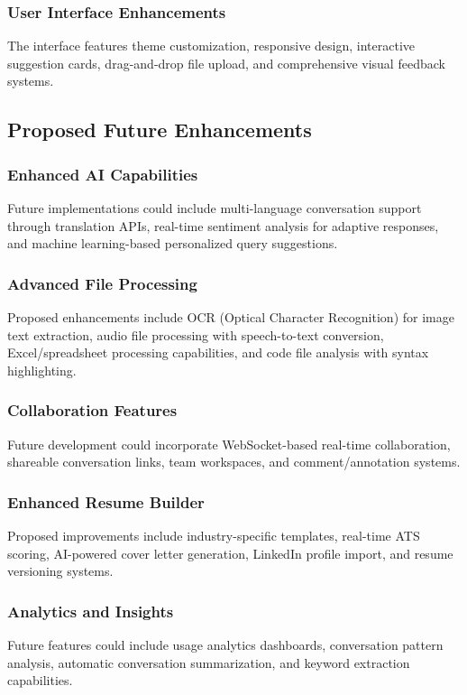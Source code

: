 \documentclass[conference]{IEEEtran}
\begin{document}
\subsubsection{User Interface Enhancements}
The interface features theme customization, responsive design, interactive suggestion cards, drag-and-drop file upload, and comprehensive visual feedback systems.

\subsection{Proposed Future Enhancements}

\subsubsection{Enhanced AI Capabilities}
Future implementations could include multi-language conversation support through translation APIs, real-time sentiment analysis for adaptive responses, and machine learning-based personalized query suggestions.

\subsubsection{Advanced File Processing}
Proposed enhancements include OCR (Optical Character Recognition) for image text extraction, audio file processing with speech-to-text conversion, Excel/spreadsheet processing capabilities, and code file analysis with syntax highlighting.

\subsubsection{Collaboration Features}
Future development could incorporate WebSocket-based real-time collaboration, shareable conversation links, team workspaces, and comment/annotation systems.

\subsubsection{Enhanced Resume Builder}
Proposed improvements include industry-specific templates, real-time ATS scoring, AI-powered cover letter generation, LinkedIn profile import, and resume versioning systems.

\subsubsection{Analytics and Insights}
Future features could include usage analytics dashboards, conversation pattern analysis, automatic conversation summarization, and keyword extraction capabilities.
\end{document}
